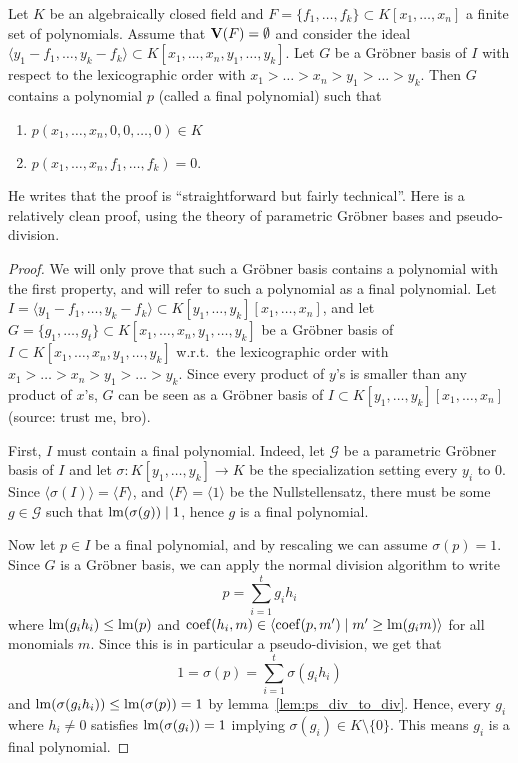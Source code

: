 \begin{theorem}
  Let $K$ be an algebraically closed field and $F = \{f_{1}, \dots, f_{k}\} \subset K[x_{1}, \dots, x_{n}]$ a finite set of polynomials. Assume that $\operatorname{\mathbf V}(F) = \emptyset$ and consider the ideal $\langle y_{1} - f_{1}, \dots, y_{k} - f_{k} \rangle \subset K[x_{1}, \dots, x_{n}, y_{1}, \dots, y_{k}]$. Let $G$ be a Gröbner basis of $I$ with respect to the lexicographic order with $x_{1} > \dots > x_{n} > y_{1} > \dots > y_{k}$. Then $G$ contains a polynomial $p$ (called a final polynomial) such that
  \begin{enumerate}
    \item $p(x_{1}, \dots, x_{n}, 0, 0, \dots, 0) \in K$
    \item $p(x_{1}, \dots, x_{n}, f_{1}, \dots, f_{k}) = 0$.
  \end{enumerate}
\end{theorem}

He writes that the proof is ``straightforward but fairly technical''. Here is a relatively clean proof, using the theory of parametric Gröbner bases and pseudo-division.

\indent \begin{proof}
  We will only prove that such a Gröbner basis contains a polynomial with the first property, and will refer to such a polynomial as a final polynomial. Let $I = \langle y_{1} - f_{1}, \dots, y_{k} - f_{k} \rangle \subset K[y_{1}, \dots, y_{k}][x_{1}, \dots, x_{n}]$, and let $G = \{g_{1}, \dots, g_{t}\} \subset K[x_{1}, \dots, x_{n}, y_{1}, \dots, y_{k}]$ be a Gröbner basis of $I \subset K[x_{1}, \dots, x_{n}, y_{1}, \dots, y_{k}]$ w.r.t.\ the lexicographic order with $x_{1} > \dots > x_{n} > y_{1} > \dots > y_{k}$. Since every product of $y$'s is smaller than any product of $x$'s, $G$ can be seen as a Gröbner basis of $I \subset K[y_{1}, \dots, y_{k}][x_{1}, \dots, x_{n}]$ (source: trust me, bro).

  First, $I$ must contain a final polynomial. Indeed, let $\mathcal G$ be a parametric Gröbner basis of $I$ and let $\sigma : K[y_{1}, \dots, y_{k}] \to K$ be the specialization setting every $y_{i}$ to 0. Since $\langle \sigma(I) \rangle = \langle F \rangle$, and $\langle F \rangle = \langle 1 \rangle$ be the Nullstellensatz, there must be some $g \in \mathcal G$ such that $\operatorname{lm}(\sigma(g)) \mid 1$, hence $g$ is a final polynomial.

  Now let $p \in I$ be a final polynomial, and by rescaling we can assume $\sigma(p) = 1$. Since $G$ is a Gröbner basis, we can apply the normal division algorithm to write
  \[p = \sum_{i=1}^{t} g_{i} h_{i}\]
  where $\operatorname{lm}(g_{i}h_{i}) \leq \operatorname{lm}(p)$ and $\operatorname{coef}(h_{i}, m) \in \langle \operatorname{coef}(p, m') \mid m' \geq \operatorname{lm}(g_{i}m) \rangle$ for all monomials $m$. Since this is in particular a pseudo-division, we get that
  \[1 = \sigma(p) = \sum_{i=1}^{t} \sigma(g_{i} h_{i})\]
  and $\operatorname{lm}(\sigma(g_{i} h_{i})) \leq \operatorname{lm}(\sigma(p)) = 1$ by lemma~\ref{lem:ps_div_to_div}. Hence, every $g_{i}$ where $h_{i} \neq 0$ satisfies $\operatorname{lm}(\sigma(g_{i})) = 1$ implying $\sigma(g_{i}) \in K \setminus \{0\}$. This means $g_{i}$ is a final polynomial.
\end{proof}


